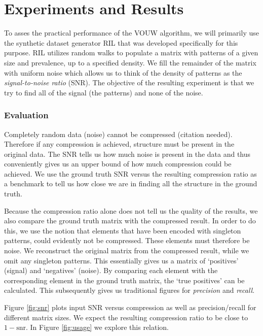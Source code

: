 \documentclass{llncs}
\begin{document}
\section{Experiments and Results}

To asses the practical performance of the VOUW algorithm, we will primarily use the synthetic dataset generator RIL that was developed specifically for this purpose. RIL utilizes random walks to populate a matrix with patterns of a given size and prevalence, up to a specified density. We fill the remainder of the matrix with uniform noise which allows us to think of the density of patterns as the \emph{signal-to-noise ratio} (SNR). The objective of the resulting experiment is that we try to find all of the signal (the patterns) and none of the noise.

\subsubsection{Evaluation}

Completely random data (noise) cannot be compressed (citation needed). Therefore if any compression is achieved, structure must be present in the original data. The SNR tells us how much noise is present in the data and thus conveniently gives us an upper bound of how much compression could be achieved. We use the ground truth SNR versus the resulting compression ratio as a benchmark to tell us how close we are in finding all the structure in the ground truth. 

Because the compression ratio alone does not tell us the quality of the results, we also compare the ground truth matrix with the compressed result. In order to do this, we use the notion that elements that have been encoded with singleton patterns, could evidently not be compressed. These elements must therefore be noise. We reconstruct the original matrix from the compressed result, while we omit any singleton patterns. This essentially gives us a matrix of `positives' (signal) and `negatives' (noise). By comparing each element with the corresponding element in the ground truth matrix, the `true positives' can be calculated. This subsequently gives us traditional  figures for \emph{precision} and \emph{recall}.

Figure \ref{fig:snr} plots input SNR versus compression as well as precision/recall for different matrix sizes. We expect the resulting compression ratio to be close to $1-\mathrm{snr}$. In Figure \ref{fig:usage} we explore this relation.
\end{document}
